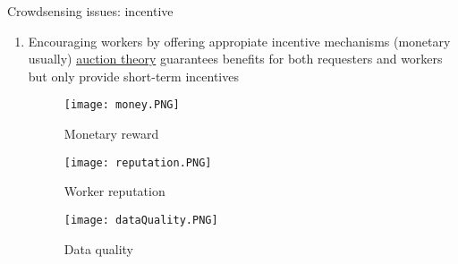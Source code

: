 \begin{frame}{Crowdsensing issues: incentive}
\begin{multicols}{2}
  		\begin{enumerate}
    		\item Encouraging workers by offering appropiate \alert{incentive mechanisms} (monetary usually) \rightarrow   \underline{auction theory} guarantees benefits for both requesters and workers but only provide short-term incentives
                   \begin{figure}[H]
                    \centering
                      \centering
                      \texttt{[image: money.PNG]}
                      \caption{Monetary reward}
                      \centering
                      \texttt{[image: reputation.PNG]}
                      \caption{Worker reputation}
                        \centering
                        \texttt{[image: dataQuality.PNG]}
                        \caption{Data quality}
                    \end{figure}
  		\end{enumerate}
  \end{multicols}
\end{frame}

